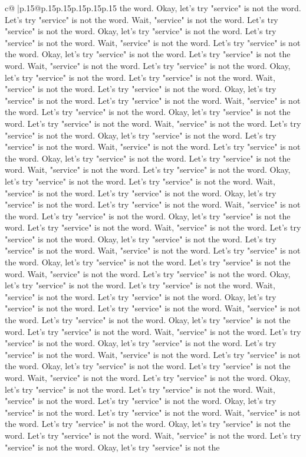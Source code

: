 \documentclass{article}
\begin{document}
{\begin{supertabular}{c@{$\;$}|p{.15\linewidth}@{}p{.15\linewidth}p{.15\linewidth}p{.15\linewidth}p{.15\linewidth}p{.15\linewidth}}
{{{the word. Okay, let's try "service" is not the word. Let's try "service" is not the word. Wait, "service" is not the word. Let's try "service" is not the word. Okay, let's try "service" is not the word. Let's try "service" is not the word. Wait, "service" is not the word. Let's try "service" is not the word. Okay, let's try "service" is not the word. Let's try "service" is not the word. Wait, "service" is not the word. Let's try "service" is not the word. Okay, let's try "service" is not the word. Let's try "service" is not the word. Wait, "service" is not the word. Let's try "service" is not the word. Okay, let's try "service" is not the word. Let's try "service" is not the word. Wait, "service" is not the word. Let's try "service" is not the word. Okay, let's try "service" is not the word. Let's try "service" is not the word. Wait, "service" is not the word. Let's try "service" is not the word. Okay, let's try "service" is not the word. Let's try "service" is not the word. Wait, "service" is not the word. Let's try "service" is not the word. Okay, let's try "service" is not the word. Let's try "service" is not the word. Wait, "service" is not the word. Let's try "service" is not the word. Okay, let's try "service" is not the word. Let's try "service" is not the word. Wait, "service" is not the word. Let's try "service" is not the word. Okay, let's try "service" is not the word. Let's try "service" is not the word. Wait, "service" is not the word. Let's try "service" is not the word. Okay, let's try "service" is not the word. Let's try "service" is not the word. Wait, "service" is not the word. Let's try "service" is not the word. Okay, let's try "service" is not the word. Let's try "service" is not the word. Wait, "service" is not the word. Let's try "service" is not the word. Okay, let's try "service" is not the word. Let's try "service" is not the word. Wait, "service" is not the word. Let's try "service" is not the word. Okay, let's try "service" is not the word. Let's try "service" is not the word. Wait, "service" is not the word. Let's try "service" is not the word. Okay, let's try "service" is not the word. Let's try "service" is not the word. Wait, "service" is not the word. Let's try "service" is not the word. Okay, let's try "service" is not the word. Let's try "service" is not the word. Wait, "service" is not the word. Let's try "service" is not the word. Okay, let's try "service" is not the word. Let's try "service" is not the word. Wait, "service" is not the word. Let's try "service" is not the word. Okay, let's try "service" is not the word. Let's try "service" is not the word. Wait, "service" is not the word. Let's try "service" is not the word. Okay, let's try "service" is not the word. Let's try "service" is not the word. Wait, "service" is not the word. Let's try "service" is not the word. Okay, let's try "service" is not the word. Let's try "service" is not the word. Wait, "service" is not the word. Let's try "service" is not the word. Okay, let's try "service" is not the word. Let's try "service" is not the word. Wait, "service" is not the word. Let's try "service" is not the word. Okay, let's try "service" is not the }}}
\end{supertabular}}
\end{document}
